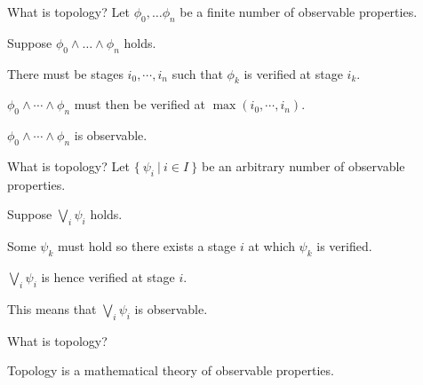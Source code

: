 \documentclass[xcolor={dvipsnames}]{beamer}
\begin{document}
\begin{frame}{What is topology?}
  Let $\phi_0, \ldots \phi_n$ be a \alert{finite} number of observable properties.

  \vspace{1em}

  Suppose $\phi_0 \wedge \ldots \wedge \phi_n$ holds.

  \vspace{1em}

  There must be \alert{stages} $i_0, \cdots, i_n$ such that $\phi_k$ is verified at stage $i_k$.

  \vspace{1em}

  $\phi_0 \wedge \cdots \wedge \phi_n$ must then be verified at $\max(i_0, \cdots, i_n)$.

  \vspace{1em}

  $\phi_0 \wedge \cdots \wedge \phi_n$ is \alert{observable}.
\end{frame}

\begin{frame}{What is topology?}
    Let $\{~\psi_i ~|~ i \in I~\}$ be an \alert{arbitrary} number of observable properties.

    \vspace{1em}

    Suppose $\bigvee_i \psi_i$ holds.

    \vspace{1em}

    Some $\psi_k$ must hold so there exists a stage $i$ at which $\psi_k$ is verified.

    \vspace{1em}

    $\bigvee_i \psi_i$ is hence verified at stage $i$.

    \vspace{1em}

    This means that $\bigvee_i \psi_i$ is \alert{observable}.
\end{frame}

\begin{frame}{What is topology?}
  \Huge
  \begin{center}
    Topology is a mathematical theory of \alert{observable} properties.
  \end{center}
\end{frame}
\end{document}
